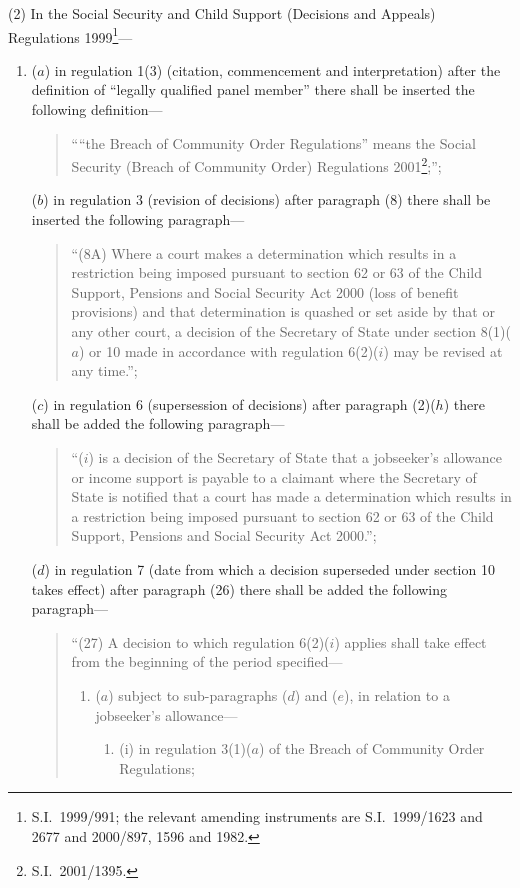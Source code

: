 \documentclass[12pt,a4paper]{article}
\begin{document}
(2) In the Social Security and Child Support (Decisions and Appeals) Regulations 1999\footnote{S.I.\ 1999/991; the relevant amending instruments are S.I.\ 1999/1623 and 2677 and 2000/897, 1596 and 1982.}—
\begin{enumerate}\item[]
($a$) in regulation 1(3) (citation, commencement and interpretation) after the definition of “legally qualified panel member” there shall be inserted the following definition—
\begin{quotation}
““the Breach of Community Order Regulations” means the Social Security (Breach of Community Order) Regulations 2001\footnote{S.I.\ 2001/1395.};”;
\end{quotation}

($b$) in regulation 3 (revision of decisions) after paragraph (8) there shall be inserted the following paragraph—
\begin{quotation}
“(8A) Where a court makes a determination which results in a restriction being imposed pursuant to section 62 or 63 of the Child Support, Pensions and Social Security Act 2000 (loss of benefit provisions) and that determination is quashed or set aside by that or any other court, a decision of the Secretary of State under section 8(1)($a$)  or 10 made in accordance with regulation 6(2)($i$) may be revised at any time.”;
\end{quotation}

($c$) in regulation 6 (supersession of decisions) after paragraph (2)($h$)  there shall be added the following paragraph—
\begin{quotation}
“($i$) is a decision of the Secretary of State that a jobseeker’s allowance or income support is payable to a claimant where the Secretary of State is notified that a court has made a determination which results in a restriction being imposed pursuant to section 62 or 63 of the Child Support, Pensions and Social Security Act 2000.”;
\end{quotation}

($d$) in regulation 7 (date from which a decision superseded under section 10 takes effect) after paragraph (26) there shall be added the following paragraph—
\begin{quotation}
“(27) A decision to which regulation 6(2)($i$) applies shall take effect from the beginning of the period specified—
\begin{enumerate}\item[]
($a$) subject to sub-paragraphs ($d$)  and ($e$), in relation to a jobseeker’s allowance—
\begin{enumerate}\item[]
(i) in regulation 3(1)($a$)  of the Breach of Community Order Regulations;


\end{enumerate}
\end{enumerate}
\end{quotation}
\end{enumerate}
\end{document}
